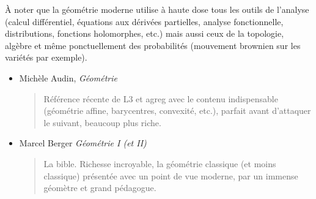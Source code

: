 \documentclass{article}
\begin{document}
À noter que la géométrie moderne utilise à haute dose tous les outils de l'analyse (calcul différentiel, équations aux dérivées partielles, analyse fonctionnelle, distributions, fonctions holomorphes, etc.) mais aussi ceux de la topologie, algèbre et même ponctuellement des probabilités (mouvement brownien sur les variétés par exemple).
\begin{mdframed}
\begin{itemize}
\item  Michèle Audin, \emph{Géométrie}
\begin{quote}
Référence récente de L3 et agreg avec le contenu indispensable (géométrie affine, barycentres, convexité, etc.), parfait avant d'attaquer le suivant, beaucoup plus riche.
\end{quote}
\end{itemize}
\end{mdframed}
\begin{itemize}
\item Marcel Berger \emph{Géométrie I (et II)}
\begin{quote}
La bible. Richesse incroyable, la géométrie classique (et moins classique) présentée avec un point de vue moderne, par un immense géomètre et grand pédagogue.
\end{quote}
\end{itemize}
\end{document}
